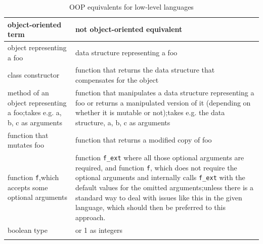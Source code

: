 \documentclass{article}
\newcounter{subsubsubsection}[subsubsection]
\begin{document}
    \begin{flushleft}
        \begin{center}
            \begin{longtable}{|>{\raggedright\arraybackslash}p{8em} | >{\raggedright\arraybackslash}p{28em} |}
                 \hline
                 object-oriented term & not object-oriented equivalent\\
                 \hline
                 \hline
                 object representing a foo & data structure representing a foo \\
                 \hline
                 class constructor & function that returns the data structure that compensates for the object \\
                 \hline
                 method of an object representing a foo;\linebreak takes e.g. a, b, c as arguments & function that manipulates a data structure representing a foo or returns a manipulated version of it (depending on whether it is mutable or not);\linebreak takes e.g. the data structure, a, b, c as arguments\\
                 \hline
                 function that mutates foo & function that returns a modified copy of foo \\
                 \hline
                 function \texttt{f},\linebreak which accepts some optional arguments & function \texttt{f\_ext} where all those optional arguments are required, and function \texttt{f}, which does not require the optional arguments and internally calls \texttt{f\_ext} with the default values for the omitted arguments;\linebreak unless there is a standard way to deal with issues like this in the given language, which should then be preferred to this approach.\\
                 \hline
                 boolean type & 0 or 1 as integers \\
                 \hline
                \caption{OOP equivalents for low-level languages}
            \end{longtable}
        \end{center}
    \end{flushleft}

\end{document}
